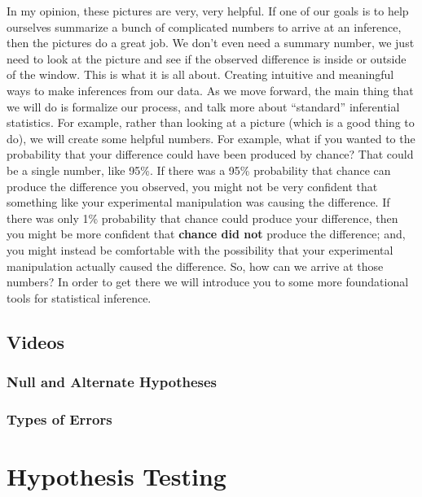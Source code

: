 \documentclass[
  letterpaper,
  DIV=11,
  numbers=noendperiod]{scrreprt}
\begin{document}
In my opinion, these pictures are very, very helpful. If one of our
goals is to help ourselves summarize a bunch of complicated numbers to
arrive at an inference, then the pictures do a great job. We don't even
need a summary number, we just need to look at the picture and see if
the observed difference is inside or outside of the window. This is what
it is all about. Creating intuitive and meaningful ways to make
inferences from our data. As we move forward, the main thing that we
will do is formalize our process, and talk more about ``standard''
inferential statistics. For example, rather than looking at a picture
(which is a good thing to do), we will create some helpful numbers. For
example, what if you wanted to the probability that your difference
could have been produced by chance? That could be a single number, like
95\%. If there was a 95\% probability that chance can produce the
difference you observed, you might not be very confident that something
like your experimental manipulation was causing the difference. If there
was only 1\% probability that chance could produce your difference, then
you might be more confident that \textbf{chance did not} produce the
difference; and, you might instead be comfortable with the possibility
that your experimental manipulation actually caused the difference. So,
how can we arrive at those numbers? In order to get there we will
introduce you to some more foundational tools for statistical inference.

\section{Videos}\label{videos-3}

\subsection{Null and Alternate
Hypotheses}\label{null-and-alternate-hypotheses}

\subsection{Types of Errors}\label{types-of-errors}


\chapter{Hypothesis Testing}\label{hypothesis-testing}
\end{document}
